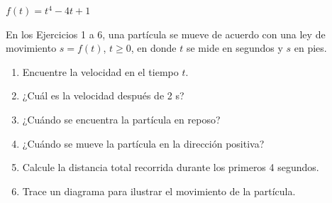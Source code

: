 \item $f(t) = t^4 - 4t + 1$
\par
En los Ejercicios 1 a 6, una partícula se mueve de acuerdo con una ley de movimiento $s = f(t)$, $t \ge 0$, en donde $t$ se mide en segundos y $s$ en pies.
\begin{enumerate}
    \item[(a)] Encuentre la velocidad en el tiempo $t$.
    \item[(b)] ¿Cuál es la velocidad después de 2 s?
    \item[(c)] ¿Cuándo se encuentra la partícula en reposo?
    \item[(d)] ¿Cuándo se mueve la partícula en la dirección positiva?
    \item[(e)] Calcule la distancia total recorrida durante los primeros 4 segundos.
    \item[(f)] Trace un diagrama para ilustrar el movimiento de la partícula.
\end{enumerate}
